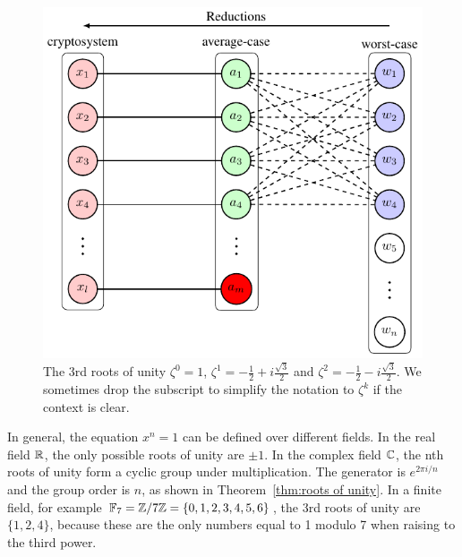 \documentclass[../main.tex]{subfiles}
\begin{document}
\begin{figure}[h]
    \centering
    \includegraphics[page=7]{images/Lattice_crypto_tikz_folder.pdf}
    \caption{The 3rd roots of unity $\zeta^0=1$, $\zeta^1=-\frac{1}{2}+i\frac{\sqrt{3}}{2}$ and $\zeta^2=-\frac{1}{2}-i\frac{\sqrt{3}}{2}$. We sometimes drop the subscript to simplify the notation to $\zeta^k$ if the context is clear.}
    \label{fig:roots of unity}
\end{figure}

In general, the equation $x^n = 1$ can be defined over different fields.
In the real field $\mathbb{R}$,  the only possible roots of unity are $\pm 1$. In the complex field $\mathbb{C}$, the nth roots of unity form a cyclic group under multiplication. The generator is $e^{2\pi i / n}$ and the group order is $n$, as shown in Theorem~\ref{thm:roots of unity}. 
%
In a finite field, for example $\mathbb{F}_7 =\mathbb{Z}/7\mathbb{Z}= \{0, 1, 2, 3, 4, 5, 6\}$, the 3rd roots of unity are $\{1,2,4\}$, because these are the only numbers equal to 1 modulo 7 when raising to the third power. 

\end{document}
